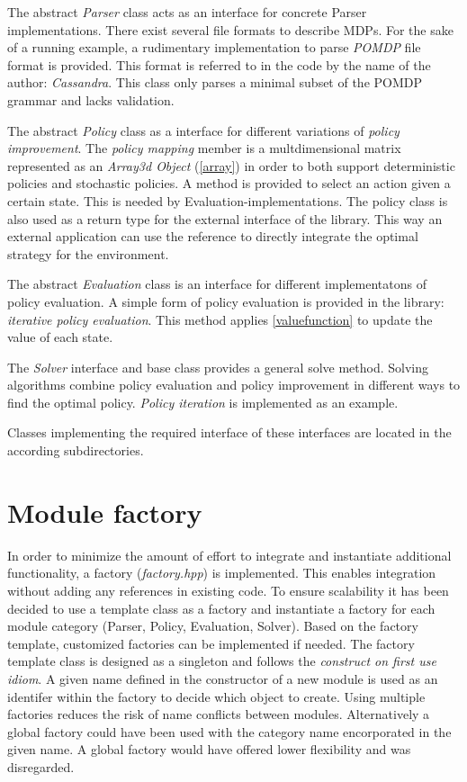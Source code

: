 The abstract \emph{Parser} class acts as an interface for concrete Parser implementations. There exist several file formats to describe MDPs. For the sake of a running example, a rudimentary implementation to parse \emph{POMDP} file format \autocite{Cassandra} is provided. This format is referred to in the code by the name of the author: \emph{Cassandra}. This class only parses a minimal subset of the POMDP grammar and lacks validation. 

The abstract \emph{Policy} class as a interface for different variations of \emph{policy improvement}. The \emph{policy mapping} member is a multdimensional matrix represented as an \emph{Array3d Object} (\autoref{array}) in order to both support deterministic policies and stochastic policies. A method is provided to select an action given a certain state. This is needed by Evaluation-implementations. The policy class is also used as a return type for the external interface of the library. This way an external application can use the reference to directly integrate the optimal strategy for the environment. 

The abstract \emph{Evaluation} class is an interface for different implementatons of policy evaluation. A simple form of policy evaluation is provided in the library: \emph{iterative policy evaluation}. This method applies \autoref{valuefunction} to update the value of each state. 

The \emph{Solver} interface and base class provides a general solve method. Solving algorithms combine policy evaluation and policy improvement in different ways to find the optimal policy. \emph{Policy iteration} is implemented as an example.

Classes implementing the required interface of these interfaces are located in the according subdirectories. 

\section{Module factory}
\label{integration}

In order to minimize the amount of effort to integrate and instantiate additional functionality, a factory (\emph{factory.hpp}) is implemented. This enables integration without adding any references in existing code. To ensure scalability it has been decided to use a template class as a factory and instantiate a factory for each module category (Parser, Policy, Evaluation, Solver). Based on the factory template, customized factories can be implemented if needed. The factory template class is designed as a singleton and follows the \emph{construct on first use idiom}. A given name defined in the constructor of a new module is used as an identifer within the factory to decide which object to create. Using multiple factories reduces the risk of name conflicts between modules.  Alternatively a global factory could have been used with the category name encorporated in the given name. A global factory would have offered lower flexibility and was disregarded. 

